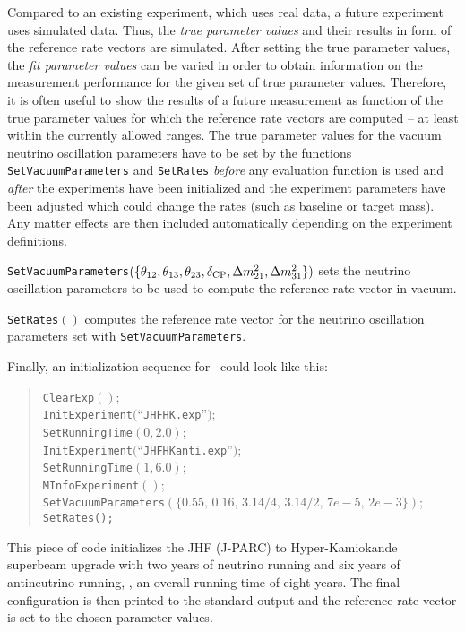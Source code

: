 Compared to an existing experiment, which uses real data, a future experiment uses simulated data. Thus, the {\em true parameter values} and their results in form of the reference rate vectors are simulated. After setting the true parameter values, the {\em fit parameter values} can be varied in order to obtain information on the measurement performance for the given set of true parameter values. Therefore, it is often useful to show the results of a future measurement as function of the true parameter values for which the reference rate vectors are computed -- at least within the currently allowed ranges. The true parameter values for the vacuum neutrino oscillation parameters have to be set by the functions {\tt SetVacuumParameters} and {\tt SetRates} {\em before} any evaluation function is used and {\em after} the experiments have been initialized and the experiment parameters have been adjusted which could change the rates (such as baseline or target mass). Any matter effects are then included automatically depending on the experiment definitions.
\begin{function}
{\tt SetVacuumParameters}$(\{\theta_{12}, \theta_{13}, \theta_{23}, \delta_{\mathrm{CP}} , \Delta m_{21}^2 , \Delta m_{31}^2 \})$ sets the neutrino oscillation parameters to be used to compute the reference rate vector in vacuum.
\end{function}
\begin{function}
{\tt SetRates}$( )$ computes the reference rate vector for the neutrino oscillation parameters set with {\tt SetVacuumParameters}. 
\end{function}
Finally, an initialization sequence for \GLOBES\ could look like this:
\begin{quote}
{\tt ClearExp}$()$; \\
{\tt InitExperiment}$($``{\tt JHFHK.exp}''$)$; \\
{\tt SetRunningTime}$(0,2.0)$; \\
{\tt InitExperiment}$($``{\tt JHFHKanti.exp}''$)$; \\
{\tt SetRunningTime}$(1,6.0)$;\\
{\tt MInfoExperiment}$()$; \\
{\tt SetVacuumParameters}$(\{ 0.55, \, 0.16, \, 3.14/4, \, 3.14/2, \, 7e-5 , \, 2e-3 \} )$; \\
{\tt SetRates();} 
\end{quote}
This piece of code initializes the JHF (J-PARC) to Hyper-Kamiokande superbeam upgrade with two years of neutrino running and six years of antineutrino running, \ie, an overall running time of eight years. The final configuration is then printed to the standard output and the reference rate vector is set to the chosen parameter values.

